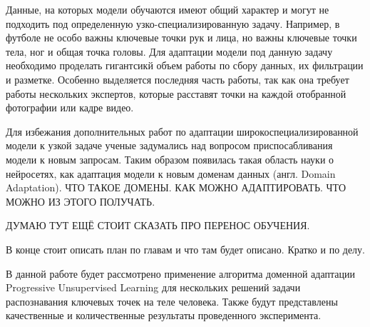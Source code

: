 Данные, на которых модели обучаются имеют общий характер и могут не подходить под определенную узко-специализированную задачу. Например, в футболе не особо важны ключевые точки рук и лица, но важны ключевые точки тела, ног и общая точка головы. Для адаптации модели под данную задачу необходимо проделать гигантсикй объем работы по сбору данных, их фильтрации и разметке. Особенно выделяется последняя часть работы, так как она требует работы нескольких экспертов, которые расставят точки на каждой отобранной фотографии или кадре видео.

Для избежания дополнительных работ по адаптации широкоспециализированной модели к узкой задаче ученые задумались над вопросом приспосабливания модели к новым запросам. Таким образом появилась такая область науки о нейросетях, как адаптация модели к новым доменам данных (англ. Domain Adaptation). ЧТО ТАКОЕ ДОМЕНЫ. КАК МОЖНО АДАПТИРОВАТЬ. ЧТО МОЖНО ИЗ ЭТОГО ПОЛУЧАТЬ.

ДУМАЮ ТУТ ЕЩЁ СТОИТ СКАЗАТЬ ПРО ПЕРЕНОС ОБУЧЕНИЯ.

\hfill \break
В конце стоит описать план по главам и что там будет описано. Кратко и по делу.

В данной работе будет рассмотрено применение алгоритма доменной адаптации Progressive Unsupervised Learning для нескольких решений задачи распознавания ключевых точек на теле человека. Также будут представлены качественные и количественные результаты проведенного эксперимента.


\newpage